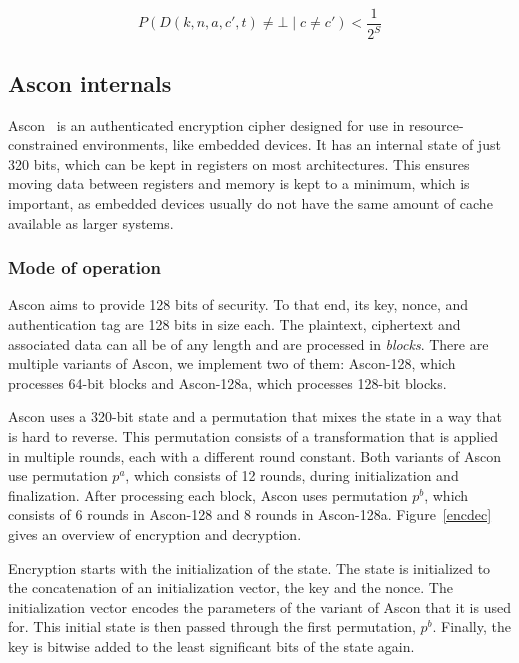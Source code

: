 \begin{equation}
    P(D(k, n, a, c', t) \neq \bot \mid c \neq c') < \frac{1}{2^S}
\end{equation}

\subsection{Ascon internals}

Ascon~\cite{ascon} is an authenticated encryption cipher designed for use in
resource-constrained environments, like embedded devices. It has an internal
state of just 320 bits, which can be kept in registers on most architectures.
This ensures moving data between registers and memory is kept to a minimum,
which is important, as embedded devices usually do not have the same amount of
cache available as larger systems.

\subsubsection{Mode of operation}

Ascon aims to provide 128 bits of security. To that end, its key, nonce, and
authentication tag are 128 bits in size each. The plaintext, ciphertext and
associated data can all be of any length and are processed in \emph{blocks}.
There are multiple variants of Ascon, we implement two of them: Ascon-128, which
processes 64-bit blocks and Ascon-128a, which processes 128-bit blocks.

Ascon uses a 320-bit state and a permutation that mixes the state in a way that
is hard to reverse. This permutation consists of a transformation that is
applied in multiple rounds, each with a different round constant. Both variants
of Ascon use permutation $p^a$, which consists of 12 rounds, during
initialization and finalization. After processing each block, Ascon uses
permutation $p^b$, which consists of 6 rounds in Ascon-128 and 8 rounds in
Ascon-128a. Figure~\ref{encdec} gives an overview of encryption and decryption.



Encryption starts with the initialization of the state. The state is initialized
to the concatenation of an initialization vector, the key and the nonce. The
initialization vector encodes the parameters of the variant of Ascon that it is
used for. This initial state is then passed through the first permutation,
$p^b$. Finally, the key is bitwise added to the least significant bits of the
state again.

